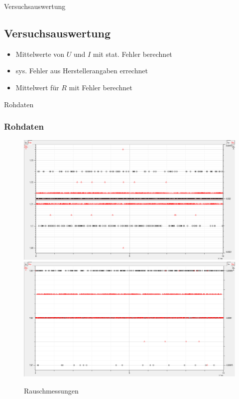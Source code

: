 \documentclass[11pt]{beamer}
\begin{document}
\begin{frame}{Versuchsauswertung}
\subsection{Versuchsauswertung}
\begin{itemize}
\item Mittelwerte von $U$ und $I$ mit stat. Fehler berechnet
\item sys. Fehler aus Herstellerangaben errechnet 
\item Mittelwert für $R$ mit Fehler berechnet
\end{itemize}
\end{frame}
\begin{frame}{Rohdaten}
\subsubsection{Rohdaten}
\begin{figure}
\includegraphics[scale=0.2]{Rauschmessung1.png}
\includegraphics[scale=0.2]{Rauschmessung2.png}  
\caption{Rauschmessungen}
\end{figure}
\end{frame}
\end{document}
